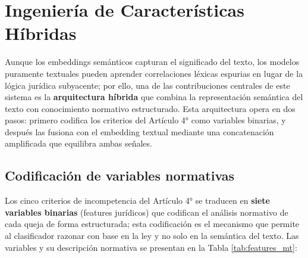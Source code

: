 \section{Ingeniería de Características Híbridas}

Aunque los embeddings semánticos capturan el significado del texto, los modelos
puramente textuales pueden aprender correlaciones léxicas espurias en lugar de la
lógica jurídica subyacente; por ello, una de las contribuciones centrales de este
sistema es la \textbf{arquitectura híbrida} que combina la representación
semántica del texto con conocimiento normativo estructurado. Esta arquitectura
opera en dos pasos: primero codifica los criterios del Artículo 4° como variables
binarias, y después las fusiona con el embedding textual mediante una
concatenación amplificada que equilibra ambas señales.

\subsection{Codificación de variables normativas}

Los cinco criterios de incompetencia del Artículo 4° se traducen en
\textbf{siete variables binarias} (features jurídicos) que codifican el análisis
normativo de cada queja de forma estructurada; esta codificación es el mecanismo
que permite al clasificador razonar con base en la ley y no solo en la semántica
del texto. Las variables y su descripción normativa se presentan en la Tabla
\ref{tab:features_mt}:

